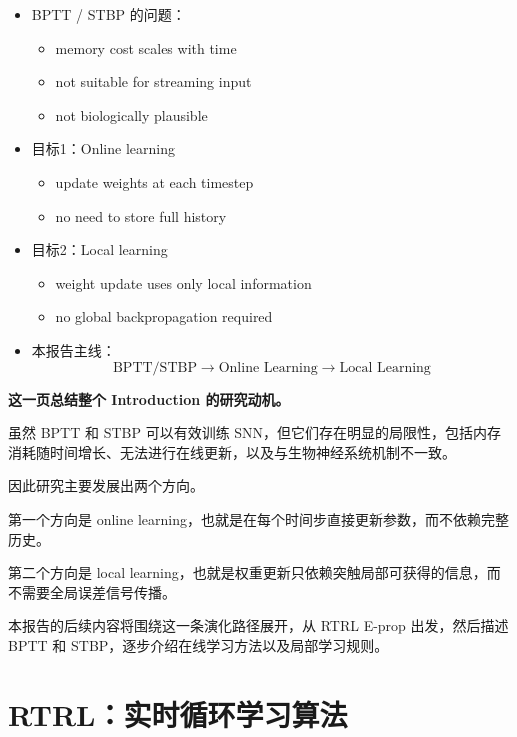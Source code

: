 \documentclass[journal,12pt,onecolumn]{IEEEtran}
\begin{document}
\begin{itemize}
  \item BPTT / STBP 的问题：
  \begin{itemize}
    \item memory cost scales with time
    \item not suitable for streaming input
    \item not biologically plausible
  \end{itemize}

  \item 目标1：Online learning
  \begin{itemize}
    \item update weights at each timestep
    \item no need to store full history
  \end{itemize}

  \item 目标2：Local learning
  \begin{itemize}
    \item weight update uses only local information
    \item no global backpropagation required
  \end{itemize}

  \item 本报告主线：
  \[
  \text{BPTT/STBP} \rightarrow \text{Online Learning} \rightarrow \text{Local Learning}
  \]
\end{itemize}


\textbf{这一页总结整个 Introduction 的研究动机。}

虽然 BPTT 和 STBP 可以有效训练 SNN，但它们存在明显的局限性，包括内存消耗随时间增长、无法进行在线更新，以及与生物神经系统机制不一致。

因此研究主要发展出两个方向。

第一个方向是 online learning，也就是在每个时间步直接更新参数，而不依赖完整历史。

第二个方向是 local learning，也就是权重更新只依赖突触局部可获得的信息，而不需要全局误差信号传播。

本报告的后续内容将围绕这一条演化路径展开，从 RTRL E-prop 出发，然后描述 BPTT 和 STBP，逐步介绍在线学习方法以及局部学习规则。




\section{RTRL：实时循环学习算法}
\end{document}
